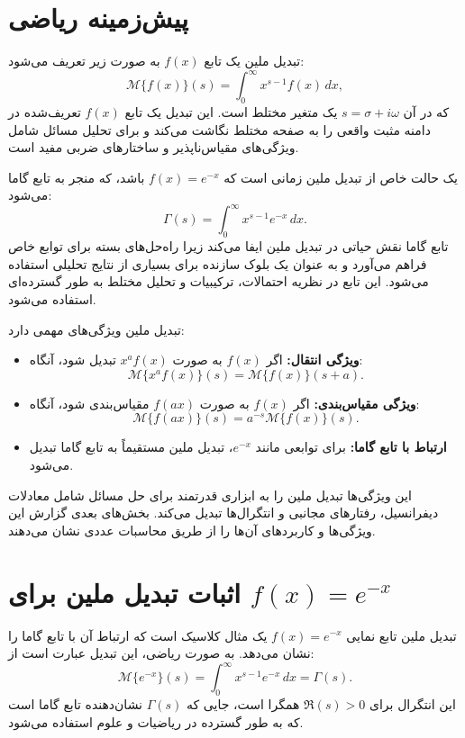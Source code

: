 \documentclass[12pt,a4paper]{article}
\begin{document}
\section{پیش‌زمینه ریاضی}
تبدیل ملین یک تابع $f(x)$ به صورت زیر تعریف می‌شود:
\begin{equation}
\mathcal{M}\{f(x)\}(s) = \int_{0}^{\infty} x^{s-1} f(x) \, dx,
\end{equation}
که در آن $s = \sigma + i\omega$ یک متغیر مختلط است. این تبدیل یک تابع $f(x)$ تعریف‌شده در دامنه مثبت واقعی را به صفحه مختلط نگاشت می‌کند و برای تحلیل مسائل شامل ویژگی‌های مقیاس‌ناپذیر و ساختارهای ضربی مفید است.

یک حالت خاص از تبدیل ملین زمانی است که $f(x) = e^{-x}$ باشد، که منجر به تابع گاما می‌شود:
\begin{equation}
\Gamma(s) = \int_{0}^{\infty} x^{s-1} e^{-x} \, dx.
\end{equation}
تابع گاما نقش حیاتی در تبدیل ملین ایفا می‌کند زیرا راه‌حل‌های بسته برای توابع خاص فراهم می‌آورد و به عنوان یک بلوک سازنده برای بسیاری از نتایج تحلیلی استفاده می‌شود. این تابع در نظریه احتمالات، ترکیبیات و تحلیل مختلط به طور گسترده‌ای استفاده می‌شود.

تبدیل ملین ویژگی‌های مهمی دارد:
\begin{itemize}
    \item \textbf{ویژگی انتقال:} اگر $f(x)$ به صورت $x^a f(x)$ تبدیل شود، آنگاه:
    \begin{equation}
    \mathcal{M}\{x^a f(x)\}(s) = \mathcal{M}\{f(x)\}(s + a).
    \end{equation}
    \item \textbf{ویژگی مقیاس‌بندی:} اگر $f(x)$ به صورت $f(ax)$ مقیاس‌بندی شود، آنگاه:
    \begin{equation}
    \mathcal{M}\{f(ax)\}(s) = a^{-s} \mathcal{M}\{f(x)\}(s).
    \end{equation}
    \item \textbf{ارتباط با تابع گاما:} برای توابعی مانند $e^{-x}$، تبدیل ملین مستقیماً به تابع گاما تبدیل می‌شود.
\end{itemize}

این ویژگی‌ها تبدیل ملین را به ابزاری قدرتمند برای حل مسائل شامل معادلات دیفرانسیل، رفتارهای مجانبی و انتگرال‌ها تبدیل می‌کند. بخش‌های بعدی گزارش این ویژگی‌ها و کاربردهای آن‌ها را از طریق محاسبات عددی نشان می‌دهند.

\section{اثبات تبدیل ملین برای $f(x) = e^{-x}$}
تبدیل ملین تابع نمایی $f(x) = e^{-x}$ یک مثال کلاسیک است که ارتباط آن با تابع گاما را نشان می‌دهد. به صورت ریاضی، این تبدیل عبارت است از:
\begin{equation}
\mathcal{M}\{e^{-x}\}(s) = \int_{0}^{\infty} x^{s-1} e^{-x} \, dx = \Gamma(s).
\end{equation}
این انتگرال برای $\Re(s) > 0$ همگرا است، جایی که $\Gamma(s)$ نشان‌دهنده تابع گاما است که به طور گسترده در ریاضیات و علوم استفاده می‌شود.
\end{document}
